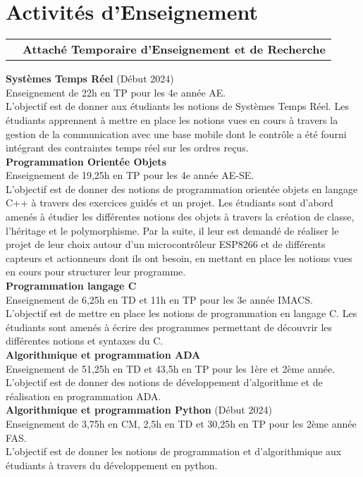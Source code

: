 \documentclass[11pt,a4paper,sans]{moderncv}         %
\makeatletter
\newcommand*{\cventrylong}[7][.25em]{%
  \begin{tabular}{@{}p{\hintscolumnwidth}@{\hspace{\separatorcolumnwidth}}p{\maincolumnwidth}@{}}%
    \raggedleft\hintstyle{#2} &{%
        {\bfseries#3}%
        \ifthenelse{\equal{#4}{}}{}{, {\slshape#4}}%
        \ifthenelse{\equal{#5}{}}{}{, #5}%
        \ifthenelse{\equal{#6}{}}{}{, #6}%
    }%
  \end{tabular}%
  \begin{addmargin}[\hintscolumnwidth+\separatorcolumnwidth]{0em}%
    {\small#7}%
  \end{addmargin}%
  \par\addvspace{#1}}
\makeatother
\begin{document}
\section{Activit\'es d'Enseignement}
\cventrylong
{Depuis 2023}
{Attach\'e Temporaire d'Enseignement et de Recherche}
{Institut National des Sciences Appliqu\'ees de Toulouse (31)}
{D\'epartement de G\'enie Electrique et Informatique}
{}
{
  \textbf{Syst\`emes Temps R\'eel} (D\'ebut 2024)\\
  Enseignement de 22h en TP pour les 4e ann\'ee AE.\\
  L'objectif est de donner aux \'etudiants les notions de Syst\`emes Temps R\'eel.
  Les \'etudiants apprennent \`a mettre en place les notions vues en cours \`a travers la gestion de la communication avec une base mobile dont le contr\^ole a \'et\'e fourni int\'egrant des contraintes temps r\'eel sur les ordres re\c cus.\\
  \textbf{Programmation Orient\'ee Objets}\\
  Enseignement de 19,25h en TP pour les 4e ann\'ee AE-SE.\\
  L'objectif est de donner des notions de programmation orient\'ee objets en langage C++ \`a travers des exercices guid\'es et un projet.
  Les \'etudiants sont d'abord amen\'es \`a \'etudier les diff\'erentes notions des objets \`a travers la cr\'eation de classe, l'h\'eritage et le polymorphisme.
  Par la suite, il leur est demand\'e de r\'ealiser le projet de leur choix autour d'un microcontr\^oleur ESP8266 et de diff\'erents capteurs et actionneurs dont ils ont besoin, en mettant en place les notions vues en cours pour structurer leur programme.\\
  \textbf{Programmation langage C}\\
  Enseignement de 6,25h en TD et 11h en TP pour les 3e ann\'ee IMACS.\\
  L'objectif est de mettre en place les notions de programmation en langage C.
  Les \'etudiants sont amen\'es \`a \'ecrire des programmes permettant de d\'ecouvrir les diff\'erentes notions et syntaxes du C.\\
  \textbf{Algorithmique et programmation ADA}\\
  Enseignement de 51,25h en TD et 43,5h en TP pour les 1\`ere et 2\`eme ann\'ee.\\
  L'objectif est de donner des notions de d\'eveloppement d'algorithme et de r\'ealisation en programmation ADA.\\
  \textbf{Algorithmique et programmation Python} (D\'ebut 2024)\\
  Enseignement de 3,75h en CM, 2,5h en TD et 30,25h en TP pour les 2\`eme ann\'ee FAS.\\
  L'objectif est de donner les notions de programmation et d'algorithmique aux \'etudiants \`a travers du d\'eveloppement en python.\\
}
\end{document}
